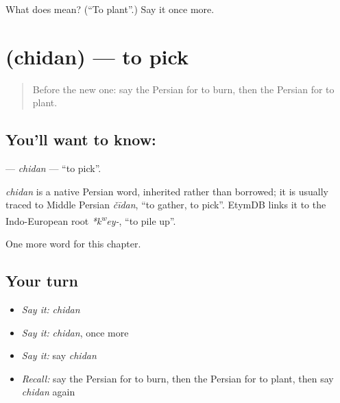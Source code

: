 \begin{tcolorbox}[breakable,colback=teal!4,colframe=teal!35!black,title={Before you move on}]
What does  mean? (\textquotedblleft{}To plant\textquotedblright{}.) Say it once more.
\end{tcolorbox}
\section[\texorpdfstring{\fa{چیدن} (chidan)}{چیدن (chidan)}]{ (chidan) — to pick}

\label{lesson:FA-C133-chidan}



\begin{quote}
Before the new one: say the Persian for to burn, then the Persian for to plant.
\end{quote}

\subsection*{You'll want to know: }
\textbf{} — \emph{chidan} — \textquotedblleft{}to pick\textquotedblright{}.

\begin{cousinweb}
\emph{chidan} is a native Persian word, inherited rather than borrowed; it is usually traced to Middle Persian \emph{čīdan}, \textquotedblleft{}to gather, to pick\textquotedblright{}. EtymDB links it to the Indo-European root \emph{*k\textsuperscript{w}ey-}, \textquotedblleft{}to pile up\textquotedblright{}.
\end{cousinweb}

\begin{grammarlens}[title={What you've built}]
One more word for this chapter.
\end{grammarlens}

\subsection*{Your turn}
\begin{itemize}
\raggedright
  \item \emph{Say it:} \emph{chidan}
  \item \emph{Say it:} \emph{chidan}, once more
  \item \emph{Say it:} say \emph{chidan}
  \item \emph{Recall:} say the Persian for to burn, then the Persian for to plant, then say \emph{chidan} again
\end{itemize}

